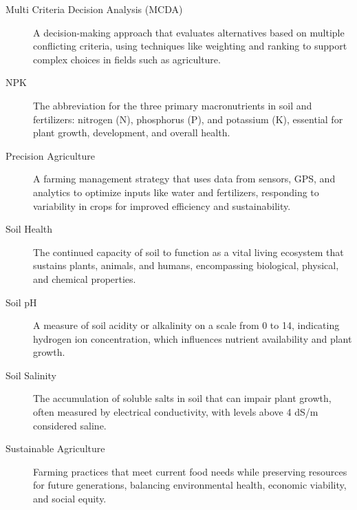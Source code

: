 \begin{doublespace}
\begin{description}
	\item[Multi Criteria Decision Analysis (MCDA)]
	A decision-making approach that evaluates alternatives based on multiple conflicting criteria, using techniques like weighting and ranking to support complex choices in fields such as agriculture.
	\item[NPK]
	The abbreviation for the three primary macronutrients in soil and fertilizers: nitrogen (N), phosphorus (P), and potassium (K), essential for plant growth, development, and overall health.
	\item[Precision Agriculture]
	A farming management strategy that uses data from sensors, GPS, and analytics to optimize inputs like water and fertilizers, responding to variability in crops for improved efficiency and sustainability.
	\item[Soil Health]
	The continued capacity of soil to function as a vital living ecosystem that sustains plants, animals, and humans, encompassing biological, physical, and chemical properties.
	\item[Soil pH]
	A measure of soil acidity or alkalinity on a scale from 0 to 14, indicating hydrogen ion concentration, which influences nutrient availability and plant growth.
	\item[Soil Salinity]
	The accumulation of soluble salts in soil that can impair plant growth, often measured by electrical conductivity, with levels above 4 dS/m considered saline.
	\item[Sustainable Agriculture]
	Farming practices that meet current food needs while preserving resources for future generations, balancing environmental health, economic viability, and social equity.
	
\end{description}
\end{doublespace}
